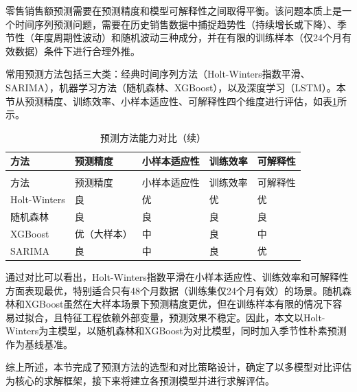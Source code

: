 零售销售额预测需要在预测精度和模型可解释性之间取得平衡。该问题本质上是一个时间序列预测问题，需要在历史销售数据中捕捉趋势性（持续增长或下降）、季节性（年度周期性波动）和随机波动三种成分，并在有限的训练样本（仅24个月有效数据）条件下进行合理外推。

常用预测方法包括三大类：经典时间序列方法（Holt-Winters指数平滑、SARIMA），机器学习方法（随机森林、XGBoost），以及深度学习（LSTM）。本节从预测精度、训练效率、小样本适应性、可解释性四个维度进行评估，如表\ref{tab:算法对比3}所示。

\begin{longtable}{>{\centering\arraybackslash}p{}>{\centering\arraybackslash}p{}>{\centering\arraybackslash}p{}>{\centering\arraybackslash}p{}>{\centering\arraybackslash}p{}}
  \caption{预测方法能力对比}
  \label{tab:算法对比3} \\
  \toprule
  方法 & 预测精度 & 小样本适应性 & 训练效率 & 可解释性 \\
  \midrule
  \endfirsthead
  \caption{预测方法能力对比（续）} \\
  \toprule
  方法 & 预测精度 & 小样本适应性 & 训练效率 & 可解释性 \\
  \midrule
  \endhead
  \bottomrule
  \endfoot
  Holt-Winters & 良 & 优 & 优 & 优 \\
  随机森林 & 良 & 良 & 良 & 良 \\
  XGBoost & 优（大样本） & 中 & 良 & 中 \\
  SARIMA & 良 & 中 & 良 & 优 \\
\end{longtable}

通过对比可以看出，Holt-Winters指数平滑在小样本适应性、训练效率和可解释性方面表现最优，特别适合只有48个月数据（训练集仅24个月有效）的场景。随机森林和XGBoost虽然在大样本场景下预测精度更优，但在训练样本有限的情况下容易过拟合，且特征工程依赖外部变量，预测效果不稳定。因此，本文以Holt-Winters为主模型，以随机森林和XGBoost为对比模型，同时加入季节性朴素预测作为基线基准。

综上所述，本节完成了预测方法的选型和对比策略设计，确定了以多模型对比评估为核心的求解框架，接下来将建立各预测模型并进行求解评估。
